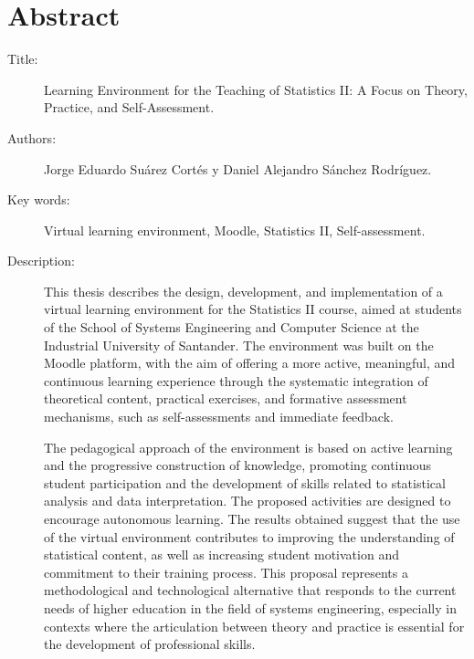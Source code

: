 \documentclass[letter,oneside,12pt,spanish]{report}
\begin{document}
\newpage

\chapter*{Abstract}

\footnotesize{
\begin{description}
  \item[Title:] Learning Environment for the Teaching of Statistics II: A Focus on Theory, Practice, and Self-Assessment.
  \item[Authors:] Jorge Eduardo Suárez Cortés y Daniel Alejandro Sánchez Rodríguez.
  \item[Key words:] Virtual learning environment, Moodle, Statistics II, Self-assessment.
  \item[Description:]This thesis describes the design, development, and implementation 
  of a virtual learning environment for the Statistics II course, aimed at students of 
  the School of Systems Engineering and Computer Science at the Industrial University of Santander. The 
  environment was built on the Moodle platform, with the aim of offering a more active, meaningful, and 
  continuous learning experience through the systematic integration of theoretical content, practical 
  exercises, and formative assessment mechanisms, such as self-assessments and immediate feedback.

  The pedagogical approach of the environment is based on active learning and the progressive construction of 
  knowledge, promoting continuous student participation and the development of skills 
  related to statistical analysis and data interpretation. The proposed activities are 
  designed to encourage autonomous learning. The results obtained suggest that the use of the
  virtual environment contributes to improving the understanding of statistical content, as well as increasing 
  student motivation and commitment to their training process. This proposal represents 
  a methodological and technological alternative that responds to the current needs of higher education
  in the field of systems engineering, especially in contexts where the articulation between theory and 
  practice is essential for the development of professional skills.

\end{description}}\normalsize
\end{document}
